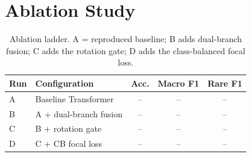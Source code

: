 \section{Ablation Study}
\label{sec:ablation}
\begin{table}[t]
\caption{Ablation ladder. A = reproduced baseline; B adds dual-branch fusion; C adds the rotation gate; D adds the class-balanced focal loss. \pending}
\label{tab:ablation}
\centering
\begin{tabular}{llccc}
\toprule
Run & Configuration & Acc. & Macro F1 & Rare F1 \\
\midrule
A & Baseline Transformer & -- & -- & -- \\
B & A + dual-branch fusion & -- & -- & -- \\
C & B + rotation gate & -- & -- & -- \\
D & C + CB focal loss & -- & -- & -- \\
\bottomrule
\end{tabular}
\end{table}
